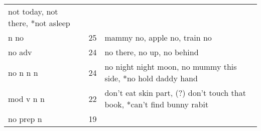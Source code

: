 \documentclass[man]{apa6}
\begin{document}
\begin{longtable}[]{@{}lll@{}}
\begin{minipage}[t]{0.47\columnwidth}
not today, not there, *not asleep\strut
\end{minipage}\tabularnewline
\begin{minipage}[t]{0.23\columnwidth}\raggedright\strut
n no\strut
\end{minipage} & \begin{minipage}[t]{0.15\columnwidth}\raggedright\strut
25\strut
\end{minipage} & \begin{minipage}[t]{0.47\columnwidth}\raggedright\strut
mammy no, apple no, train no\strut
\end{minipage}\tabularnewline
\begin{minipage}[t]{0.23\columnwidth}\raggedright\strut
no adv\strut
\end{minipage} & \begin{minipage}[t]{0.15\columnwidth}\raggedright\strut
24\strut
\end{minipage} & \begin{minipage}[t]{0.47\columnwidth}\raggedright\strut
no there, no up, no behind\strut
\end{minipage}\tabularnewline
\begin{minipage}[t]{0.23\columnwidth}\raggedright\strut
no n n n\strut
\end{minipage} & \begin{minipage}[t]{0.15\columnwidth}\raggedright\strut
24\strut
\end{minipage} & \begin{minipage}[t]{0.47\columnwidth}\raggedright\strut
no night night moon, no mummy this side, *no hold daddy hand\strut
\end{minipage}\tabularnewline
\begin{minipage}[t]{0.23\columnwidth}\raggedright\strut
mod v n n\strut
\end{minipage} & \begin{minipage}[t]{0.15\columnwidth}\raggedright\strut
22\strut
\end{minipage} & \begin{minipage}[t]{0.47\columnwidth}\raggedright\strut
don't eat skin part, (?) don't touch that book, *can't find bunny
rabit\strut
\end{minipage}\tabularnewline
\begin{minipage}[t]{0.23\columnwidth}\raggedright\strut
no prep n\strut
\end{minipage} & \begin{minipage}[t]{0.15\columnwidth}\raggedright\strut
19\strut
\end{minipage} & \begin{minipage}[t]{0.47\columnwidth}\raggedright\strut

\end{minipage}
\end{longtable}
\end{document}
